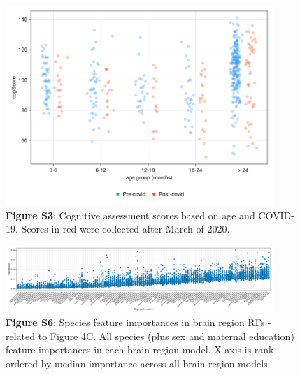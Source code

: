 \documentclass{article}
\begin{document}
\begin{figure}[h]
    \centering
    \includegraphics[width=0.9\textwidth]{assets/Supp_Figure3.png}
    \captionsetup{labelformat=empty}
    \caption{
        \textbf{Figure S3}: Cognitive assessment scores based on age
        and COVID-19. Scores in red were collected after March of 2020.
    }
\end{figure}

\begin{figure}[h]
  \centering
  \includegraphics[width=0.9\textwidth]{assets/Supp_Figure6.png}
  \captionsetup{labelformat=empty}
  \caption{
      \textbf{Figure S6}: Species feature importances in brain region RFs - related to Figure 4C.
      All species (plus sex and maternal education) feature importances in each brain region model.
      X-axis is rank-ordered by median importance across all brain region models.
  }
\end{figure}
\end{document}
